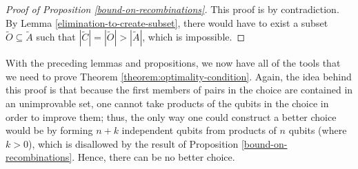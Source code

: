 \documentclass[twocolumn,showpacs,preprintnumbers,amsmath,amssymb,nofootinbib,pra,floatfix]{revtex4-1}
\newenvironment{remark}[1][Remark]{\begin{trivlist}
\item[\hskip \labelsep {\bfseries #1}]}{\end{trivlist}}
\newcommand{\set}{\tilde}
\begin{document}
\begin{proof}[Proof of Proposition \ref{bound-on-recombinations}]
This proof is by contradiction.  By Lemma \ref{elimination-to-create-subset}, there would have to exist a subset $\set O\subseteq\set A$ such that $|\set C|=|\set O|>|\set A|$, which is impossible.
\end{proof}
\begin{remark}
With the preceding lemmas and propositions, we now have all of the tools that we need to prove Theorem \ref{theorem:optimality-condition}.  Again, the idea behind this proof is that because the first members of pairs in the choice are contained in an unimprovable set, one cannot take products of the qubits in the choice in order to improve them;  thus, the only way one could construct a better choice would be by forming $n+k$ independent qubits from products of $n$ qubits (where $k>0$), which is disallowed by the result of Proposition \ref{bound-on-recombinations}.  Hence, there can be no better choice.
\end{remark}
\end{document}
